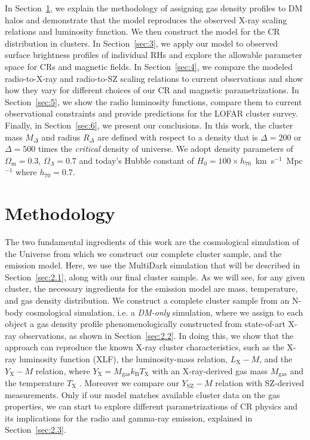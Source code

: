 \documentclass[traditabstract]{aa}
\newcommand{\rmn}{\mathrm}
\begin{document}
In Section~\ref{sec:2}, we explain the methodology of assigning gas density
profiles to DM halos and demonstrate that the model reproduces the observed
X-ray scaling relations and luminosity function. We then construct the model for
the CR distribution in clusters. In Section~\ref{sec:3}, we apply our model to
observed surface brightness profiles of individual RHs and explore the allowable
parameter space for CRs and magnetic fields. In Section~\ref{sec:4}, we compare
the modeled radio-to-X-ray and radio-to-SZ scaling relations to current
observations and show how they vary for different choices 
of our CR and magnetic parametrizations. In Section~\ref{sec:5}, we show 
the radio luminosity functions, compare them to current observational
constraints and provide predictions for the LOFAR cluster survey. Finally, in
Section~\ref{sec:6}, we present our conclusions. In this work, the cluster mass
$M_{\Delta}$ and radius $R_{\Delta}$ are defined with respect to a density that
is $\Delta=200$ or $\Delta=500$ times the \emph{critical} density of
universe. We adopt density parameters of $\Omega_{\rmn{m}}=0.3$,
$\Omega_{\Lambda}=0.7$ and today's Hubble constant of $H_0 = 100 \times
h_{70}$~km~s$^{-1}$~Mpc$^{-1}$ where $h_{70} = 0.7$.


\section{Methodology}
\label{sec:2}
The two fundamental ingredients of this work are the cosmological simulation of
the Universe from which we construct our complete cluster sample, and the
emission model. Here, we use the MultiDark simulation that will be described in
Section~\ref{sec:2.1}, along with our final cluster sample. As we will see, for
any given cluster, the necessary ingredients for the emission model are mass,
temperature, and gas density distribution. We construct a complete cluster
sample from an N-body cosmological simulation, i.e. a \emph{DM-only} simulation,
where we assign to each object a gas density profile phenomenologically
constructed from state-of-art X-ray observations, as shown in
Section~\ref{sec:2.2}. In doing this, we show that the approach can reproduce
the known X-ray cluster characteristics, such as the X-ray luminosity function
(XLF), the luminosity-mass relation, $L_{\rmn{X}}- M$, and the $Y_{\rmn{X}}-M$
relation, where $Y_{\rmn{X}}=M_\rmn{gas}k_{\rmn{B}}T_{\rmn{X}}$ with an X-ray-derived gas
mass $M_{\rmn{gas}}$ and the temperature $T_{\rmn{X}}$
\citep{2006ApJ...650..128K}. Moreover we compare our $Y_{\rmn{SZ}}-M$ relation
with SZ-derived measurements.  Only if our model matches available cluster data on
the gas properties, we can start to explore different parametrizations of CR
physics and its implications for the radio and gamma-ray emission, explained in
Section~\ref{sec:2.3}.
\end{document}
